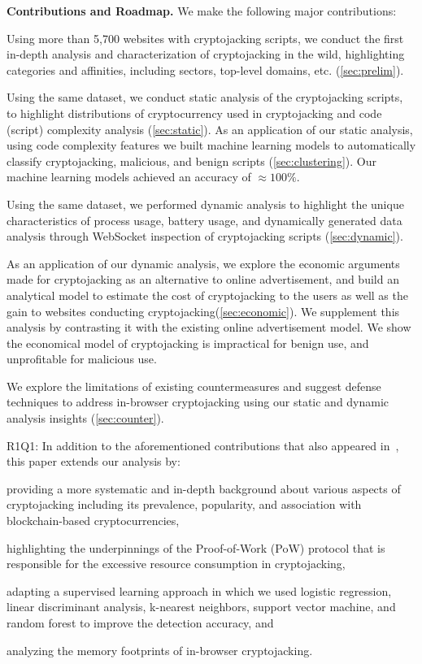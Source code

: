 \documentclass[acmlarge]{acmart}
\newcommand{\BfPara}[1]{{\noindent\bf#1.}\xspace\xspace}
\newcommand{\cc}{{cryptocurrency}\xspace}
\newcommand{\cj}{cryptojacking\xspace}
\begin{document}
\BfPara{Contributions and Roadmap}
We make the following major contributions:
\begin{enumerate*}
    \item Using more than 5,700 websites with \cj scripts, we conduct the first in-depth analysis and characterization of \cj in the wild, highlighting categories and affinities, including sectors, top-level domains, etc. (\textsection\ref{sec:prelim}). 
    \item Using the same dataset, we conduct static analysis of the \cj scripts, to highlight distributions of \cc used in \cj and code (script) complexity analysis (\textsection\ref{sec:static}). As an application of our static analysis, using code complexity features we built machine learning models to automatically classify \cj, malicious, and benign scripts (\textsection\ref{sec:clustering}). Our machine learning models achieved an accuracy of $\approx100\%$. 
    \item Using the same dataset, we performed dynamic analysis to highlight the unique characteristics of process usage, battery usage, and dynamically generated data analysis through WebSocket inspection of \cj scripts (\textsection\ref{sec:dynamic}). 
    \item As an application of our dynamic analysis, we explore the economic arguments made for \cj as an alternative to online advertisement, and build an analytical model to estimate the cost of \cj to the users as well as the gain to websites conducting \cj (\textsection\ref{sec:economic}). We supplement this analysis by contrasting it with the existing online advertisement model. We show the economical model of \cj is impractical for benign use, and unprofitable for malicious use. 
    \item We explore the limitations of existing countermeasures and suggest defense techniques to address in-browser \cj using our static and dynamic analysis insights (\textsection\ref{sec:counter}). 
    \end{enumerate*}
{\color{blue}    
R1Q1: In addition to the aforementioned contributions that also appeared in~\cite{SaadKM19}, this paper extends our analysis by: 
    \begin{enumerate*}
    \item providing a more systematic and in-depth background about various aspects of cryptojacking including its prevalence, popularity, and association with blockchain-based cryptocurrencies, 
    \item highlighting the underpinnings of the Proof-of-Work (PoW) protocol that is responsible for the excessive resource consumption in \cj, 
    \item adapting a supervised learning approach in which we used logistic regression, linear discriminant analysis, k-nearest neighbors, support vector machine, and random forest to improve the detection accuracy, and 
    \item analyzing the memory footprints of in-browser \cj.
    \end{enumerate*}
}    
\end{document}
